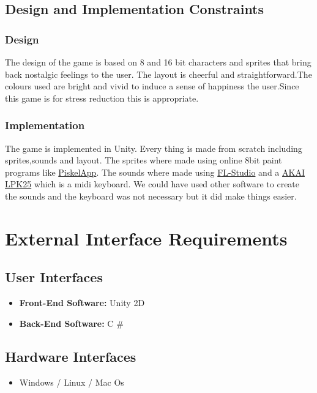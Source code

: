 \section{Design and Implementation Constraints}
\subsection {Design}
The design of the game is based on 8 and 16 bit characters and sprites that bring back nostalgic feelings to the user. The layout is cheerful and straightforward.The colours used are bright and vivid to induce a sense of happiness the user.Since this game is for stress reduction this is appropriate.
\subsection{Implementation}
The game is implemented in Unity. Every thing is made from scratch including sprites,sounds and layout.
The sprites where made using online 8bit paint programs like \href{https://www.piskelapp.com/}{PiskelApp}.
The sounds where made using \href{https://www.image-line.com/flstudio/}{FL-Studio} and a \href{https://www.amazon.co.uk/AKAI-Professional-LPK25-Portable-Controller/dp/B002M8GBDI}{AKAI LPK25} which is a midi keyboard.
We could have used other software to create the sounds and the keyboard was not necessary but it did make things easier.
\newpage




\chapter{External Interface Requirements}
\label{External Interface Requirements}

\section{User Interfaces}

\begin{itemize}
    \item \textbf{Front-End Software:} Unity 2D
    \item \textbf{Back-End Software:} C \#
\end{itemize}

\section{Hardware Interfaces}
\begin{itemize}
    \item Windows / Linux / Mac Os
\end{itemize}

